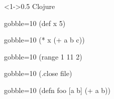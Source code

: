 \documentclass{beamer}
\begin{document}
\begin{frame}[fragile, t]
\begin{columns}[T]
    \begin{column}<1->{0.5\textwidth}
      Clojure
      \begin{overprint}
        \begin{cljcode*}{gobble=10}
          (def x 5)
        \end{cljcode*}
      \end{overprint}
      \begin{overprint}
        \begin{cljcode*}{gobble=10}
          (* x (+ a b c))
        \end{cljcode*}
      \end{overprint}
      \begin{overprint}
        \begin{cljcode*}{gobble=10}
          (range 1 11 2)
        \end{cljcode*}
      \end{overprint}
      \begin{overprint}
        \begin{cljcode*}{gobble=10}
          (.close file)
        \end{cljcode*}
      \end{overprint}
      \begin{overprint}
        \begin{cljcode*}{gobble=10}
          (defn foo [a b]
            (+ a b))
        \end{cljcode*}
      \end{overprint}
    \end{column}
  \end{columns}
\end{frame}
\end{document}
